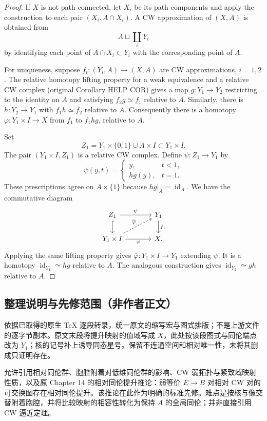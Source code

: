 \documentclass[UTF8,11pt]{ctexart}
\theoremstyle{definition}
\DeclareMathOperator{\id}{id}
\begin{document}
\begin{proof}
If $X$ is not path connected, let $X_i$ be its path components and apply the
construction to each pair $(X_i,A\cap X_i)$. A CW approximation of $(X,A)$ is
obtained from
\[
 A\sqcup\coprod_iY_i
\]
by identifying each point of $A\cap X_i\subset Y_i$ with the corresponding
point of $A$.

For uniqueness, suppose $f_i:(Y_i,A)\to(X,A)$ are CW approximations,
$i=1,2$. The relative homotopy lifting property for a weak equivalence and
a relative CW complex (original Corollary HELP COR) gives a map
$g:Y_1\to Y_2$ restricting to the identity on $A$ and satisfying
$f_2g\simeq f_1$ relative to $A$. Similarly, there is $h:Y_2\to Y_1$
with $f_1h\simeq f_2$ relative to $A$. Consequently there is a homotopy
$\varphi:Y_1\times I\to X$ from $f_1$ to $f_1hg$, relative to $A$.

Set
\[
 Z_1=Y_1\times\{0,1\}\cup A\times I\subset Y_1\times I.
\]
The pair $(Y_1\times I,Z_1)$ is a relative CW complex. Define
$\psi:Z_1\to Y_1$ by
\[
 \psi(y,t)=\begin{cases}y,&t<1,\\hg(y),&t=1.\end{cases}
\]
These prescriptions agree on $A\times\{1\}$ because $hg|_A=\id_A$.
We have the commutative diagram
\[
\begin{tikzcd}[column sep=large]
Z_1 \arrow[r,"\psi"] \arrow[d,hook] &Y_1\arrow[d,"f_1"]\\
Y_1\times I \arrow[r,"\varphi"'] \arrow[ur,dashed,"\overline\varphi"] & X.
\end{tikzcd}
\]
Applying the same lifting property gives $\overline\varphi:Y_1\times I\to Y_1$
extending $\psi$. It is a homotopy $\id_{Y_1}\simeq hg$ relative to $A$.
The analogous construction gives $\id_{Y_2}\simeq gh$ relative to $A$.
\end{proof}

\subsection*{整理说明与先修范围（非作者正文）}
依据已取得的原生 TeX 逐段转录，统一原文的缩写宏与图式排版；不是上游文件的逐字节副本。原文末段将提升映射的值域写成 $X$，此处按该段图式与同伦端点改为 $Y_1$；核的记号补上诱导同态星号。保留不连通空间和相对唯一性，未将其删成只证明存在。

允许引用相对同伦群、胞腔附着对低维同伦群的影响、CW 弱拓扑与紧致域映射性质，以及原 Chapter 14 的相对同伦提升推论：弱等价 $E\to B$ 对相对 CW 对的可交换图存在相对同伦提升。该推论在此作为明确的标准先修。难点是按核与像交替附着胞腔，并将比较映射的相容性转化为保持 $A$ 的全局同伦；并非直接引用 CW 逼近定理。
\end{document}
